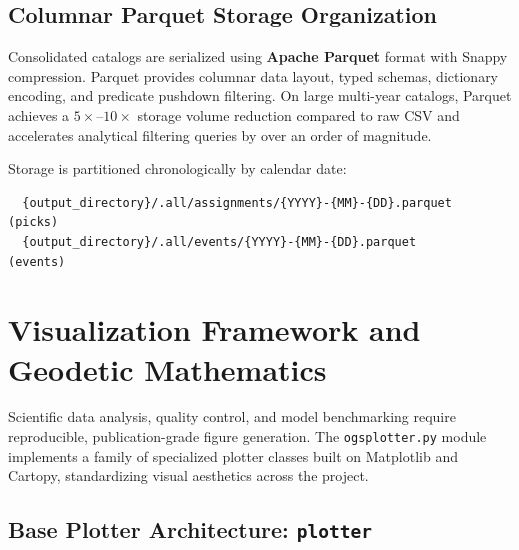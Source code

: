 \subsection{Columnar Parquet Storage Organization}
\label{subsec:parquet_storage}

Consolidated catalogs are serialized using \textbf{Apache Parquet} format with Snappy compression. Parquet provides columnar data layout, typed schemas, dictionary encoding, and predicate pushdown filtering. On large multi-year catalogs, Parquet achieves a $5\times\text{--}10\times$ storage volume reduction compared to raw CSV and accelerates analytical filtering queries by over an order of magnitude.

Storage is partitioned chronologically by calendar date:
\begin{verbatim}
  {output_directory}/.all/assignments/{YYYY}-{MM}-{DD}.parquet  (picks)
  {output_directory}/.all/events/{YYYY}-{MM}-{DD}.parquet       (events)
\end{verbatim}

\section{Visualization Framework and Geodetic Mathematics}
\label{sec:visualization_framework}

Scientific data analysis, quality control, and model benchmarking require reproducible, publication-grade figure generation. The \texttt{ogsplotter.py} module implements a family of specialized plotter classes built on Matplotlib and Cartopy, standardizing visual aesthetics across the project.

\subsection{Base Plotter Architecture: \texttt{plotter}}
\label{subsec:base_plotter}

